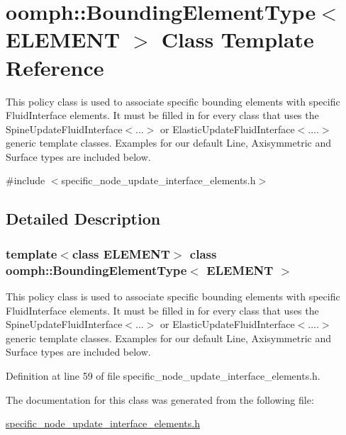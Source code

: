 \hypertarget{classoomph_1_1BoundingElementType}{}\section{oomph\+:\+:Bounding\+Element\+Type$<$ E\+L\+E\+M\+E\+NT $>$ Class Template Reference}
\label{classoomph_1_1BoundingElementType}


This policy class is used to associate specific bounding elements with specific Fluid\+Interface elements. It must be filled in for every class that uses the Spine\+Update\+Fluid\+Interface$<$...$>$ or Elastic\+Update\+Fluid\+Interface$<$....$>$ generic template classes. Examples for our default Line, Axisymmetric and Surface types are included below.  




{\ttfamily \#include $<$specific\+\_\+node\+\_\+update\+\_\+interface\+\_\+elements.\+h$>$}



\subsection{Detailed Description}
\subsubsection*{template$<$class E\+L\+E\+M\+E\+NT$>$\newline
class oomph\+::\+Bounding\+Element\+Type$<$ E\+L\+E\+M\+E\+N\+T $>$}

This policy class is used to associate specific bounding elements with specific Fluid\+Interface elements. It must be filled in for every class that uses the Spine\+Update\+Fluid\+Interface$<$...$>$ or Elastic\+Update\+Fluid\+Interface$<$....$>$ generic template classes. Examples for our default Line, Axisymmetric and Surface types are included below. 

Definition at line 59 of file specific\+\_\+node\+\_\+update\+\_\+interface\+\_\+elements.\+h.



The documentation for this class was generated from the following file\+:\begin{DoxyCompactItemize}
\item 
\hyperlink{specific__node__update__interface__elements_8h}{specific\+\_\+node\+\_\+update\+\_\+interface\+\_\+elements.\+h}\end{DoxyCompactItemize}
